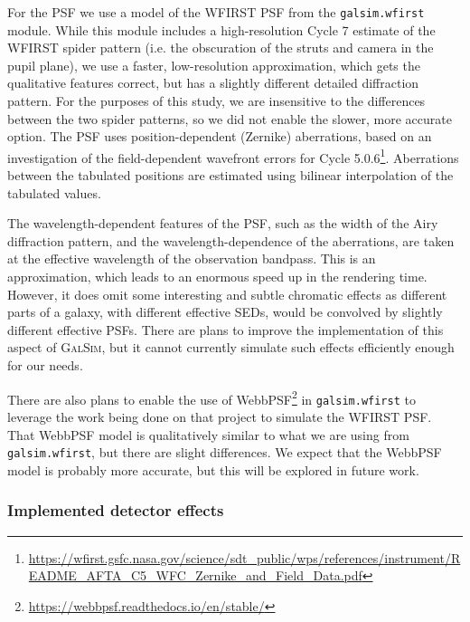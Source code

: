\documentclass[aps,prd, amsmath,amssymb,superscriptaddress,showkeys,nofootinbib,reprint,preprintnumbers]{revtex4-1}
\newcommand{\galsim}{\textsc{GalSim}}
\begin{document}
For the PSF we use a model of the WFIRST PSF from the \texttt{galsim.wfirst} module.
While this module includes a high-resolution Cycle 7 estimate of the WFIRST spider pattern (i.e. the obscuration of the struts and camera in the pupil plane), we use a faster, low-resolution approximation, which gets the qualitative features correct, but has a slightly different detailed diffraction pattern.  
For the purposes of this study, we are insensitive to the differences between the two spider patterns, so we did not enable the slower, more accurate option.
The PSF uses position-dependent (Zernike) aberrations, based on an investigation of the field-dependent wavefront errors for Cycle 5.0.6\footnote{\url{https://wfirst.gsfc.nasa.gov/science/sdt_public/wps/references/instrument/README_AFTA_C5_WFC_Zernike_and_Field_Data.pdf}}.
Aberrations between the tabulated positions are estimated using bilinear interpolation of the tabulated values.

The wavelength-dependent features of the PSF, such as the width of the Airy diffraction pattern, and the wavelength-dependence of the aberrations, are taken at the effective wavelength of the observation bandpass.
This is an approximation, which leads to an enormous speed up in the rendering time.
However, it does omit some interesting and subtle chromatic effects as different parts of a galaxy, with different effective SEDs, would be convolved by slightly different effective PSFs.
There are plans to improve the implementation of this aspect of \galsim, but it cannot currently simulate such effects efficiently enough for our needs.

There are also plans to enable the use of WebbPSF\footnote{\url{https://webbpsf.readthedocs.io/en/stable/}} in \texttt{galsim.wfirst} to leverage the work being done on that project to simulate the WFIRST PSF.
That WebbPSF model is qualitatively similar to what we are using from \texttt{galsim.wfirst}, but there are slight differences.
We expect that the WebbPSF model is probably more accurate, but this will be explored in future work.

\subsubsection{Implemented detector effects}\label{effects}
\end{document}
